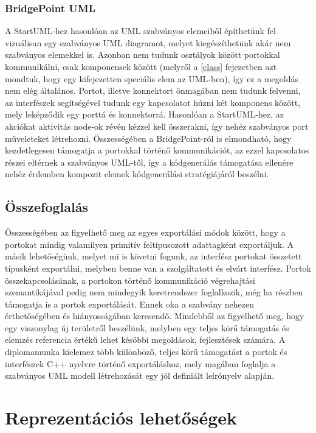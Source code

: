 \documentclass[a4paper,12pt]{report}
\begin{document}
\subsection{BridgePoint UML}
A StartUML-hez hasonlóan az UML szabványos elemeiből építhetünk fel vizuálisan egy szabványos UML diagramot, melyet kiegészíthetünk akár nem szabványos elemekkel is. Azonban nem tudunk osztályok között portokkal kommunikálni, csak komponensek között (melyről a \ref{class} fejezetben azt mondtuk, hogy egy kifejezetten speciális elem az UML-ben), így ez a megoldás nem elég általános. Portot, illetve konnektort önmagában nem tudunk felvenni, az interfészek segítségével tudunk egy kapcsolatot húzni két komponens között, mely leképződik egy porttá és konnektorrá. Hasonlóan a StartUML-hez, az akciókat aktivitás node-ok révén kézzel kell összerakni, így nehéz szabványos port műveleteket létrehozni. Összességében a BridgePoint-ról \cite{bridge} is elmondható, hogy kezdetlegesen támogatja a portokkal történő kommunikációt, az ezzel kapcsolatos részei eltérnek a szabványos UML-től, így a kódgenerálás támogatása ellenére nehéz érdemben kompozit elemek kódgenerálási stratégiájáról beszélni. 

\section{Összefoglalás}
Összességében az figyelhető meg az egyes exportálási módok között, hogy a portokat mindig valamilyen primitív feltípusozott adattagként exportáljuk. A másik lehetőségünk, melyet mi is követni fogunk, az interfész portokat összetett típusként exportálni, melyben benne van a szolgáltatott és elvárt interfész. Portok összekapcsolásának, a portokon történő kommunikáció végrehajtási szemantikájával pedig nem mindegyik keretrendszer foglalkozik, még ha részben támogatja is a portok exportálását. Ennek oka a szabvány nehezen érthetőségében és hiányosságában keresendő. Mindebből az figyelhető meg, hogy egy viszonylag új területről beszélünk, melyben egy teljes körű támogatás és elemzés referencia értékű lehet későbbi megoldások, fejlesztések számára. A diplomamunka kielemez több különböző, teljes körű támogatást a portok és interfészek C++ nyelvre történő exportáláshoz, mely magában foglalja a szabványos UML modell létrehozását egy jól definiált leírónyelv alapján.

\chapter{Reprezentációs lehetőségek} \label{reprezentation}
\end{document}
